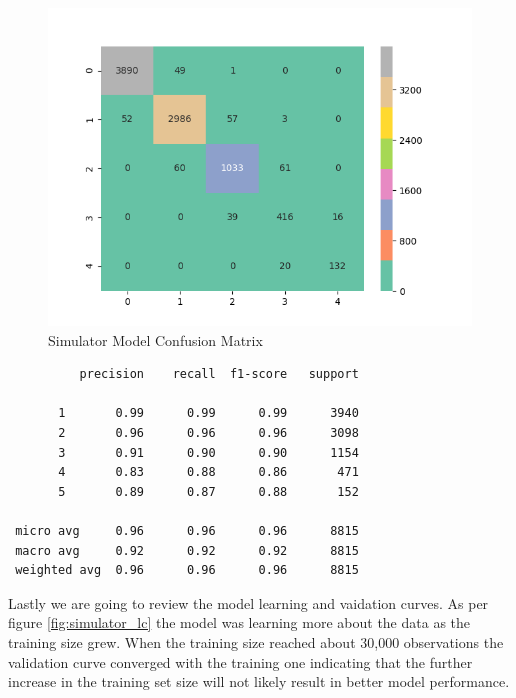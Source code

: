 \begin{Schunk}
\begin{figure}[H]

{\centering \includegraphics[width=1\linewidth]{../../models/training/simulator_rf_tuned_large_matrix} 

}

\caption[Simulator Model Confusion Matrix]{Simulator Model Confusion Matrix}\label{fig:simulator_cm}
\end{figure}
\end{Schunk}

\begin{verbatim}
          precision    recall  f1-score   support

       1       0.99      0.99      0.99      3940
       2       0.96      0.96      0.96      3098
       3       0.91      0.90      0.90      1154
       4       0.83      0.88      0.86       471
       5       0.89      0.87      0.88       152

 micro avg     0.96      0.96      0.96      8815
 macro avg     0.92      0.92      0.92      8815
 weighted avg  0.96      0.96      0.96      8815
\end{verbatim}

Lastly we are going to review the model learning and vaidation curves.
As per figure \ref{fig:simulator_lc} the model was learning more about
the data as the training size grew. When the training size reached about
30,000 observations the validation curve converged with the training one
indicating that the further increase in the training set size will not
likely result in better model performance.

